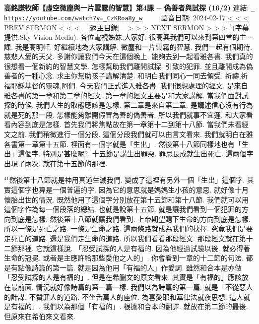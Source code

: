 \documentclass{book}
\begin{document}
\section{}
\label{sec:_CzKRoa8y_w}
\textbf{高銘謙牧師【虛空微塵與一片雲霧的智慧】第4課 ─ 偽善者與試探 (16/2)}
\newline
\newline
連結: \href{https://youtube.com/watch?v=_CzKRoa8y_w}{\texttt{ https://youtube.com/watch?v=\_CzKRoa8y\_w}} ~~~~ 語音日期: 2024-02-17 
\newline
\newline
\hyperref[sec:XJPrqJx8e0Y]{\small{< < < PREV SERMON < < <}}
~
\hyperref[sec:index]{\small{[返主目錄]}}
~
\hyperref[sec:GvsPo_gDoyw]{\small{> > > NEXT SERMON > > >}}
\newline
\newline
$^{1}$(字幕提供:Sky Vision Media).
各位電視姊妹,大家好.
很高興我們可以來到第四堂的主一課.
我是高明軒.
好繼續地為大家講解.
微塵和一片雲霧的智慧.
我們一起有個期待.
慈悲人愛的天父.
多謝你讓我們今天在這個晚上.
能夠去到一起看雅各書.
我們真的很想看一個新約的智慧文學.
怎樣幫助我們離開試探.
引致的犯罪.
並且離開成為偽善者的一種心念.
求主你幫助孩子講解清楚.
和明白我們同心一同去領受.
祈禱,祈福耶穌基督的靈魂,阿們.
今天我們正式進入雅各書.
我們很想處理的經文.
是來自雅各書的第一章和第二章的經文.
第一章的經文主要是和大家講解.
當我們面對試探的時候.
我們人生的取態應該是怎樣.
第二章是來自第二章.
是講述信心沒有行為就是死的那一段.
怎樣能夠離開假冒為善的偽善者.
所以我們就事不宜遲.
和大家看看內容到底是怎樣.
首先我們將焦點放在第一章第十二到第十八節.
當我們未看經文之前.
我們稍微進行一個分段.
這個分段我們就可以由言文看來.
我們就明白在雅各書第一章第十五節.
裡面有一個字就是「生出」.
然後第十八節同樣地也有「生出」這個字.
特別是甚麼呢?.
十五節是講生出罪惡.
罪忌長成就生出死亡.
這兩個字出現了兩次.
就在第十五節的那裡.

$^{41}$然後第十八節就是神用真道生滅我們.
變成了這裡有另外一個「生出」這個字.
其實這個字也算是一個普遍的字.
因為它的意思就是媽媽生小孩的意思.
就好像十月懷胎出世的情況.
既然他用了這個字分別放在第十五節和第十八節.
我們就可以用這個字作為每一個段落的總結.
也就是說第十五節.
就是讓我們看到一個犯罪的方向到底是怎樣.
然後第十八節就讓我們看到.
上帝期望賜下生命的方向到底是怎樣.
所以一條是死亡之路.
一條是生命之路.
這兩條路就成為我們的抉擇.
究竟我們是要走死亡的道路.
還是我們走生命的道路.
所以我們看看那段經文.
那段經文就在第十二節那裡.
它就這樣說.
「忍受試探的人是有福的.
因為他經過試驗以後.
就必得著生命的冠冕.
或者是主應許給那些愛他之人的」.
你會看到一章的十二節的句法.
都是有點像詩篇的第一篇.
就是因為他用「有福的人」作愛詞.
雖然和合本是亦做「忍受試探的人是有福的」.
但是在希臘文的原文看來.
其實是「有福的」應該放在最前面.
情況就好像詩篇的第一篇一樣.
我們以為詩篇的第一篇.
就是「不從惡人的計謀.
不贊罪人的道路.
不坐舌萬人的座位.
為喜愛耶和華律法就夜思想.
這人就是有福的」.
我們以為那個「有福的」.
根據和合本的翻譯.
就放在第二節的最後.
但原來在希伯來文看來.
\end{document}
